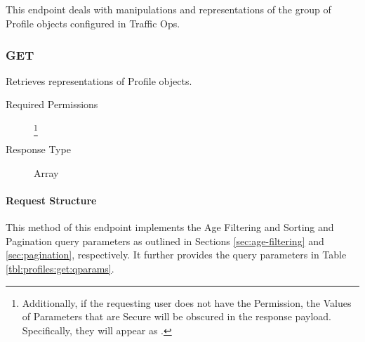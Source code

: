 %
%

\subsection{}
This endpoint deals with manipulations and representations of the group of
Profile objects configured in Traffic Ops.

\subsubsection{GET}
Retrieves representations of Profile objects.
\begin{description}
	\item[Required Permissions] \footnote{Additionally, if
		the requesting user does not have the 
		Permission, the Values of Parameters that are Secure will be obscured in
		the response payload. Specifically, they will appear as \code{*****}.}
	\item[Response Type] Array
\end{description}

\paragraph{Request Structure}
This method of this endpoint implements the Age Filtering and Sorting and
Pagination query parameters as outlined in Sections \ref{sec:age-filtering} and
\ref{sec:pagination}, respectively. It further provides the query parameters in
Table \ref{tbl:profiles:get:qparams}.

